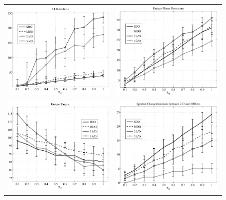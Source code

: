 \begin{figure}[ht]
 \begin{center}
  \begin{tabular}{c c}
   \includegraphics[width=2.9in]{./figures/c4m_ADETs} &
   \includegraphics[width=2.9in]{./figures/c4m_AuDETs} \\
   \includegraphics[width=2.9in]{./figures/c4m_Auvisits} &
   \includegraphics[width=2.9in]{./figures/c4m_ASPECTRA}

\end{tabular}
\end{center}
\end{figure}
